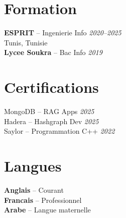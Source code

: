 \documentclass[10pt,a4paper]{article}
\begin{document}
\section*{Formation}
{\footnotesize
\textbf{ESPRIT} -- Ingenierie Info \hfill \textit{2020--2025}\\
Tunis, Tunisie\\[2pt]
\textbf{Lycee Soukra} -- Bac Info \hfill \textit{2019}
}

\section*{Certifications}
{\footnotesize
MongoDB -- RAG Apps \hfill \textit{2025}\\
Hadera -- Hashgraph Dev \hfill \textit{2025}\\
Saylor -- Programmation C++ \hfill \textit{2022}
}

\section*{Langues}
{\footnotesize
\textbf{Anglais} -- Courant\\
\textbf{Francais} -- Professionnel\\
\textbf{Arabe} -- Langue maternelle
}
\end{document}
